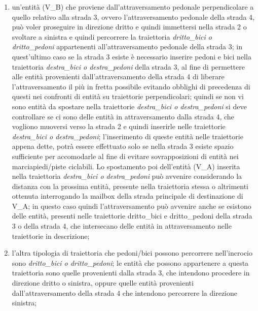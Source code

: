 \begin{enumerate}
\begin{enumerate}
\item un'entità (V\_B) che proviene dall'attraversamento pedonale perpendicolare a quello relativo alla strada 3, ovvero l'attraversamento pedonale della strada 4, può voler proseguire in direzione dritto e quindi immettersi nella strada 2 o svoltare a sinistra e quindi percorrere la traiettoria \textit{drit\-to\_bi\-ci o drit\-to\_pe\-do\-ni} appartenenti all'attraversamento pedonale della strada 3; in quest'ultimo caso se la strada 3 esiste è necessario inserire pedoni e bici nella traiettoria \textit{des\-tra\_bi\-ci o des\-tra\_pe\-do\-ni} della strada 3, al fine di permettere alle entità provenienti dall'attraversamento della strada 4 di liberare l'attraversamento il più in fretta possibile evitando obblighi di precedenza di questi nei confronti di entità su traiettorie perpendicolari; quindi se non vi sono entità da spostare nella traiettorie \textit{des\-tra\_bi\-ci o des\-tra\_pe\-do\-ni} si deve controllare se ci sono delle entità in attraversamento dalla strada 4, che vogliono muoversi verso la strada 2 e quindi inserirle nelle traiettorie \textit{des\-tra\_bi\-ci o des\-tra\_pe\-do\-ni}; l'inserimento di queste entità nelle traiettorie appena dette, potrà essere effettuato solo se nella strada 3 esiste spazio sufficiente per accomodarle al fine di evitare sovrapposizioni di entità nei marciapiedi/piste ciclabili. Lo spostamento poi dell'entità (V\_A) inserita nella traiettoria \textit{des\-tra\_bi\-ci o des\-tra\_pe\-do\-ni} può avvenire considerando la distanza con la prossima entità, presente nella traiettoria stessa o altrimenti ottenuta interrogando la mailbox della strada principale di destinazione di V\_A; in questo caso quindi l'attraversamento può avvenire anche se esistono delle entità, presenti nelle traiettorie drit\-to\_bi\-ci e drit\-to\_pe\-do\-ni della strada 3 o della strada 4, che intersecano delle entità in attraversamento nelle traiettorie in descrizione;
\item l'altra tipologia di traiettoria che pedoni/bici possono percorrere nell'incrocio sono \textit{drit\-to\_bi\-ci o drit\-to\_pe\-do\-ni}; le entità che possono appartenere a questa traiettoria sono quelle provenienti dalla strada 3, che intendono procedere in direzione dritto o sinistra, oppure quelle entità provenienti dall'attraversamento della strada 4 che intendono percorrere la direzione sinistra;\\

\end{enumerate}
\end{enumerate}

